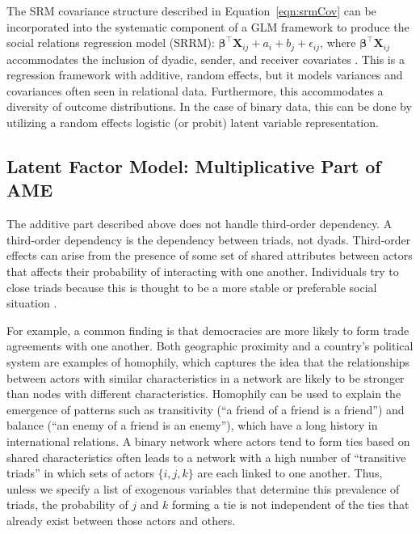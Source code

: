 \documentclass[12pt]{amsart}
\begin{document}
The SRM covariance structure described in Equation~\ref{eqn:srmCov} can be incorporated into the systematic component of a GLM framework to produce the social relations regression model (SRRM): $\bm\beta^{\top} \mathbf{X}_{ij} + a_{i} + b_{j} + \epsilon_{ij}$, where $ \bm\beta^{\top} \mathbf{X}_{ij}$ accommodates the inclusion of dyadic, sender, and receiver covariates \citep{hoff:2005}. This is a regression framework with additive, random effects, but it models variances and covariances often seen in relational data. Furthermore, this accommodates a diversity of outcome distributions. In the case of binary data, this can be done by utilizing a random effects logistic (or probit) latent variable representation. 

\subsection{\textbf{Latent Factor Model: Multiplicative Part of AME}}

The additive part described above does not handle third-order dependency. A third-order dependency is the dependency between triads, not dyads. Third-order effects can arise from the presence of some set of shared attributes between actors that affects their probability of interacting with one another. Individuals try to close triads because this is thought to be a more stable or preferable social situation \citep{wasserman:faust:1994,zinnes:1967}.

For example, a common finding is that democracies are more likely to form trade agreements with one another. Both geographic proximity and a country's political system are examples of homophily, which captures the idea that the relationships between actors with similar characteristics in a network are likely to be stronger than nodes with different characteristics. Homophily can be used to explain the emergence of patterns such as transitivity (``a friend of a friend is a friend'') and balance (``an enemy of a friend is an enemy''), which have a long history in international relations. A binary network where actors tend to form ties based on shared characteristics  often leads to a network with a high number of ``transitive triads'' in which  sets of actors $\{i,j,k\}$ are each linked to one another. Thus, unless we specify a list of exogenous variables that determine this prevalence of triads, the probability of $j$ and $k$ forming a tie is not independent of the ties that already exist between those actors and others.
\end{document}
